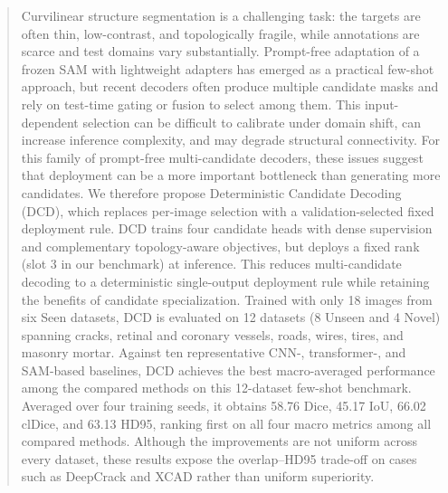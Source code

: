\begin{abstract}
Curvilinear structure segmentation is a challenging task: the targets are often
thin, low-contrast, and topologically fragile, while annotations are scarce and
test domains vary substantially.
Prompt-free adaptation of a frozen SAM with lightweight adapters has emerged as
a practical few-shot approach, but recent decoders often produce multiple
candidate masks and rely on test-time gating or fusion to select among them.
This input-dependent selection can be difficult to calibrate under domain shift,
can increase inference complexity, and may degrade structural connectivity.
For this family of prompt-free multi-candidate decoders, these issues suggest
that deployment can be a more important bottleneck than generating more
candidates.
We therefore propose Deterministic Candidate Decoding (DCD), which replaces
per-image selection with a validation-selected fixed deployment rule.
DCD trains four candidate heads with dense supervision and complementary
topology-aware objectives, but deploys a fixed rank (slot 3 in our benchmark)
at inference.
This reduces multi-candidate decoding to a deterministic single-output
deployment rule while retaining the benefits of candidate specialization.
Trained with only 18 images from six Seen datasets, DCD is evaluated on 12
datasets (8 Unseen and 4 Novel) spanning cracks, retinal and coronary vessels,
roads, wires, tires, and masonry mortar.
Against ten representative CNN-, transformer-, and SAM-based baselines, DCD
achieves the best macro-averaged performance among the compared methods on
this 12-dataset few-shot benchmark.
Averaged over four training seeds, it obtains 58.76 Dice, 45.17 IoU,
66.02 clDice, and 63.13 HD95, ranking first on all four macro metrics among
all compared methods.
Although the improvements are not uniform across every dataset, these results
expose the overlap--HD95 trade-off on cases such as DeepCrack and XCAD rather
than uniform superiority.
\end{abstract}
